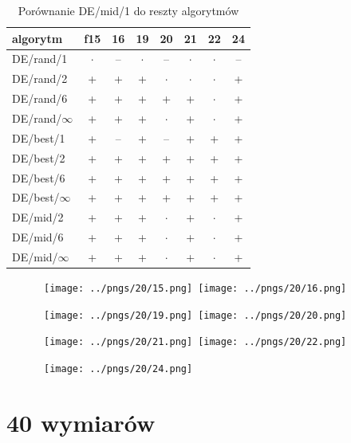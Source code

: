 \documentclass[a4paper,onecolumn,oneside,11pt,wide,floatssmall]{mwrep}
\theoremstyle{definition}
\theoremstyle{plain}%
\theoremstyle{remark}
\begin{document}
\begin{table}[H]
\centering
\begin{tabular}{ l | c | c | c | c | c | c | c }
algorytm         &f15& 16& 19& 20& 21& 22& 24 \\ \hline
DE/rand/1	 & $\cdot$ & -- & $\cdot$ & -- & $\cdot$ & $\cdot$ & -- \\
DE/rand/2	 & + & + & + & $\cdot$ & $\cdot$ & $\cdot$ & + \\
DE/rand/6	 & + & + & + & + & + & $\cdot$ & + \\
DE/rand/$\infty$	 & + & + & + & $\cdot$ & + & $\cdot$ & + \\
DE/best/1	 & + & -- & + & -- & + & + & + \\
DE/best/2	 & + & + & + & + & + & + & + \\
DE/best/6	 & + & + & + & + & + & + & + \\
DE/best/$\infty$	 & + & + & + & + & + & + & + \\
DE/mid/2	 & + & + & + & $\cdot$ & + & $\cdot$ & + \\
DE/mid/6	 & + & + & + & $\cdot$ & + & $\cdot$ & + \\
DE/mid/$\infty$	 & + & + & + & $\cdot$ & + & $\cdot$ & + \\
\end{tabular}
\caption{Porównanie DE/mid/1 do reszty algorytmów}
\end{table}

\begin{figure}[H]
\centering
\mbox{
\texttt{[image: ../pngs/20/15.png]} \quad
\texttt{[image: ../pngs/20/16.png]} 
}
\end{figure}

\begin{figure}[H]
\centering
\mbox{
\texttt{[image: ../pngs/20/19.png]} \quad
\texttt{[image: ../pngs/20/20.png]} 
}
\end{figure}

\begin{figure}[H]
\centering
\mbox{
\texttt{[image: ../pngs/20/21.png]} \quad
\texttt{[image: ../pngs/20/22.png]} 
}
\end{figure}

\begin{figure}[H]
\centering
\mbox{
\texttt{[image: ../pngs/20/24.png]} \quad
}
\end{figure}

\section{40 wymiarów}
\end{document}
